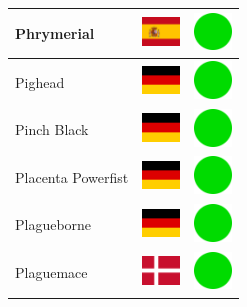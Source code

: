 \documentclass[12pt, a4paper, twoside]{report}
\begin{document}
\begin{center}
\begin{longtable}{|p{5cm}|p{2cm}|p{2cm}|}
 Phrymerial                                                 & \includegraphics[width=1cm]{../4x3/es} &   \includegraphics[width=1cm]{../likes/y} \\ \hline
 Pighead                                                    & \includegraphics[width=1cm]{../4x3/de} &   \includegraphics[width=1cm]{../likes/y} \\ \hline
 Pinch Black                                                & \includegraphics[width=1cm]{../4x3/de} &   \includegraphics[width=1cm]{../likes/y} \\ \hline
 Placenta Powerfist                                         & \includegraphics[width=1cm]{../4x3/de} &   \includegraphics[width=1cm]{../likes/y} \\ \hline
 Plagueborne                                                & \includegraphics[width=1cm]{../4x3/de} &   \includegraphics[width=1cm]{../likes/y} \\ \hline
 Plaguemace                                                 & \includegraphics[width=1cm]{../4x3/dk} &   \includegraphics[width=1cm]{../likes/y} \\ \hline

\end{longtable}
\end{center}
\end{document}
